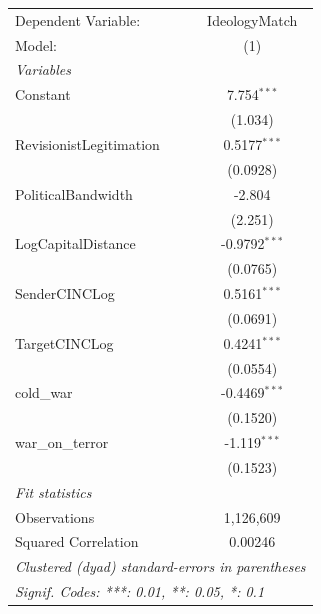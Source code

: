 
\begingroup
\centering
\begin{tabular}{lc}
   \tabularnewline \midrule \midrule
   Dependent Variable:     & IdeologyMatch\\  
   Model:                  & (1)\\  
   \midrule
   \emph{Variables}\\
   Constant                & 7.754$^{***}$\\   
                           & (1.034)\\   
   RevisionistLegitimation & 0.5177$^{***}$\\   
                           & (0.0928)\\   
   PoliticalBandwidth      & -2.804\\   
                           & (2.251)\\   
   LogCapitalDistance      & -0.9792$^{***}$\\   
                           & (0.0765)\\   
   SenderCINCLog           & 0.5161$^{***}$\\   
                           & (0.0691)\\   
   TargetCINCLog           & 0.4241$^{***}$\\   
                           & (0.0554)\\   
   cold\_war               & -0.4469$^{***}$\\   
                           & (0.1520)\\   
   war\_on\_terror         & -1.119$^{***}$\\   
                           & (0.1523)\\   
   \midrule
   \emph{Fit statistics}\\
   Observations            & 1,126,609\\  
   Squared Correlation     & 0.00246\\  
   \midrule \midrule
   \multicolumn{2}{l}{\emph{Clustered (dyad) standard-errors in parentheses}}\\
   \multicolumn{2}{l}{\emph{Signif. Codes: ***: 0.01, **: 0.05, *: 0.1}}\\
\end{tabular}
\par\endgroup


